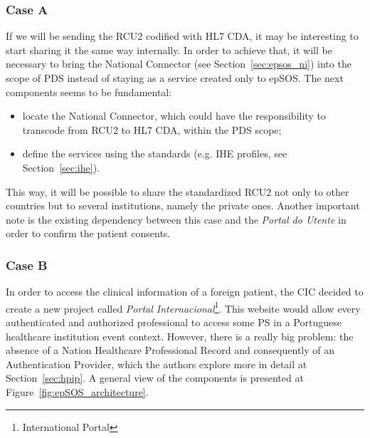 \subsubsection{Case A}

If we will be sending the RCU2 codified with HL7 CDA, it may be interesting to start sharing it the same way internally. In order to achieve that, it will be necessary to bring the National Connector (see Section~\ref{sec:epsos_ni}) into the scope of PDS instead of staying as a service created only to epSOS. The next components seems to be fundamental:
\begin{itemize}
\item locate the National Connector, which could have the responsibility to transcode from RCU2 to HL7 CDA, within the PDS scope;
\item define the services using the standards (e.g. IHE profiles, see Section~\ref{sec:ihe}).
\end{itemize}

This way, it will be possible to share the standardized RCU2 not only to other countries but to several institutions, namely the private ones. Another important note is the existing dependency between this case and the \textit{Portal do Utente} in order to confirm the patient consents.


\subsubsection{Case B}

In order to access the clinical information of a foreign patient, the CIC decided to create a new project called \textit{Portal Internacional}\footnote{International Portal}. This website would allow every authenticated and authorized professional to access some PS in a Portuguese healthcare institution event context. However, there is a really big problem: the absence of a Nation Healthcare Professional Record and consequently of an Authentication Provider, which the authors explore more in detail at Section~\ref{sec:hpip}. A general view of the components is presented at Figure~\ref{fig:epSOS_architecture}.




